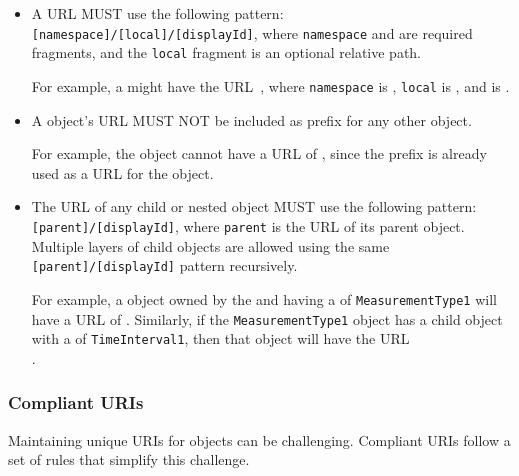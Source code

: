 \begin{itemize}

 \item A  URL MUST use the following pattern:
  \texttt{[namespace]/[local]/[displayId]},  where \texttt{namespace} and  are required fragments, and the \texttt{local} fragment is an optional relative path.
  
  	For example, a  might have the URL~, where \texttt{namespace} is , \texttt{local} is , and  is .

  \item A  object's URL MUST NOT be included as prefix for any other  object.
  
  	For example, the   object cannot have a URL of , since the  prefix is already used as a URL for the   object.

  \item The URL of any child or nested object MUST use the following pattern:\texttt{[parent]/[displayId]}, where \texttt{parent} is the URL of its parent object.
	Multiple layers of child objects are allowed using the same\\ \texttt{[parent]/[displayId]} pattern recursively.
	
	For example, a  object owned by the   and having a  of \texttt{MeasurementType1} will have a URL of .
	Similarly, if the \texttt{MeasurementType1} object has a  child object with a  of \texttt{TimeInterval1}, then that object will have the URL\\ .
  \end{itemize}

\subsubsection{Compliant URIs}
\label{sec:compliant}

Maintaining unique URIs for objects can be challenging.  Compliant URIs follow a set of rules that simplify this challenge.

